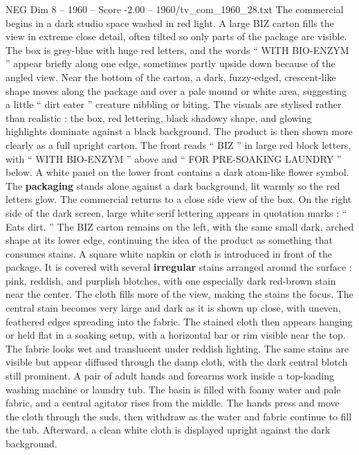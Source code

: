 \begin{textsample}{NEG Dim 8 – 1960 – Score -2.00 – 1960/tv\_com\_1960\_28.txt}  \label{ex:f8_neg_013}
The commercial begins in a dark studio space washed in red light.
A large BIZ carton fills the view in extreme close detail, often tilted so only parts of the package are visible.
The box is grey-blue with huge red letters, and the words “ WITH BIO-ENZYM ” appear briefly along one edge, sometimes partly upside down because of the angled view.
Near the bottom of the carton, a dark, fuzzy-edged, crescent-like shape moves along the package and over a pale mound or white area, suggesting a little “ dirt eater ” creature nibbling or biting.
The visuals are stylised rather than realistic : the box, red lettering, black shadowy shape, and glowing highlights dominate against a black background.
The product is then shown more clearly as a full upright carton.
The front reads “ BIZ ” in large red block letters, with “ WITH BIO-ENZYM ” above and “ FOR PRE-SOAKING LAUNDRY ” below.
A white panel on the lower front contains a dark atom-like flower symbol.
The \textbf{packaging} stands alone against a dark background, lit warmly so the red letters glow.
The commercial returns to a close side view of the box.
On the right side of the dark screen, large white serif lettering appears in quotation marks : “ Eats dirt. ” The BIZ carton remains on the left, with the same small dark, arched shape at its lower edge, continuing the idea of the product as something that consumes stains.
A square white napkin or cloth is introduced in front of the package.
It is covered with several \textbf{irregular} stains arranged around the surface : pink, reddish, and purplish blotches, with one especially dark red-brown stain near the center.
The cloth fills more of the view, making the stains the focus.
The central stain becomes very large and dark as it is shown up close, with uneven, feathered edges spreading into the fabric.
The stained cloth then appears hanging or held flat in a soaking setup, with a horizontal bar or rim visible near the top.
The fabric looks wet and translucent under reddish lighting.
The same stains are visible but appear diffused through the damp cloth, with the dark central blotch still prominent.
A pair of adult hands and forearms work inside a top-loading washing machine or laundry tub.
The basin is filled with foamy water and pale fabric, and a central agitator rises from the middle.
The hands press and move the cloth through the suds, then withdraw as the water and fabric continue to fill the tub.
Afterward, a clean white cloth is displayed upright against the dark background.

\end{textsample}
